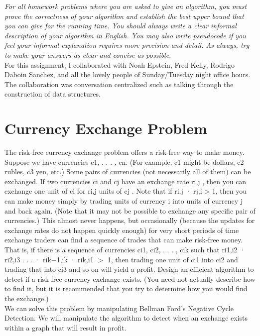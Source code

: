\documentclass[11pt, solution, letterpaper]{format}
\begin{document}
\emph{For all homework problems where you are asked to give an algorithm, you must prove the correctness of your
algorithm and establish the best upper bound that you can give for the running time. You should always write a
clear informal description of your algorithm in English. You may also write pseudocode if you feel your informal
explanation requires more precision and detail. As always, try to make your answers as clear and concise as
possible.}\\

For this assignment, I collaborated with Noah Epstein, Fred Kelly, Rodrigo Daboin Sanchez, and all the lovely people of Sunday/Tuesday night office hours. The collaboration was conversation centralized such as talking through the construction of data structures.


\section{Currency Exchange Problem}
The risk-free currency exchange problem offers a risk-free way to make money. Suppose we have currencies c1, . . . , cn.
(For example, c1 might be dollars, c2 rubles, c3 yen, etc.) Some pairs of currencies (not necessarily all of them) can
be exchanged. If two currencies ci and cj have an exchange rate ri,j , then you can exchange one unit of ci for ri,j
units of cj . Note that if ri,j · rj,i > 1, then you can make money simply by trading units of currency i into units
of currency j and back again. (Note that it may not be possible to exchange any specific pair of currencies.) This
almost never happens, but occasionally (because the updates for exchange rates do not happen quickly enough) for
very short periods of time exchange traders can find a sequence of trades that can make risk-free money. That is, if
there is a sequence of currencies ci1, ci2, . . . , cik such that ri1,i2 · ri2,i3 . . . · rik−1,ik · rik,i1 $>$ 1, then trading one unit of ci1 into ci2 and trading that into ci3 and so on will yield a profit. Design an efficient algorithm to detect if a risk-free currency exchange exists. (You need not actually describe how to find it, but it is recommended that you try to determine how you would find the exchange.)\\

We can solve this problem by manipulating Bellman Ford's Negative Cycle Detection. We will manipulate the algorithm to detect when an exchange exists within a graph that will result in profit. \\
\end{document}
